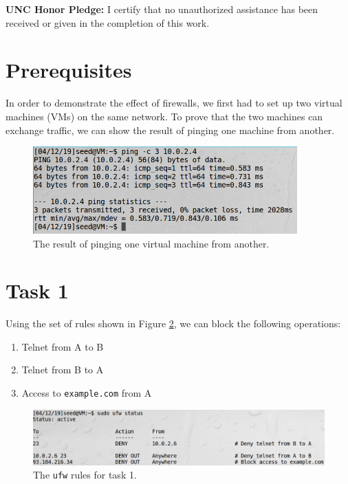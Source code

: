\documentclass[12pt,letterpaper]{article}
\author{Chathan Driehuys}
\begin{document}
	\noindent \textbf{UNC Honor Pledge:} I certify that no unauthorized assistance has been received or given in the completion of this work.
	
	\vspace{.5in}
	
	\section*{Prerequisites}
		In order to demonstrate the effect of firewalls, we first had to set up two virtual machines (VMs) on the same network. To prove that the two machines can exchange traffic, we can show the result of pinging one machine from another.
		
		\begin{figure}[h]
			\begin{center}
				\includegraphics[width=4in]{task-0-ping}
			\end{center}
			\caption{The result of pinging one virtual machine from another.}
			\label{fig:task-0-ping}
		\end{figure}
	
	\section*{Task 1}
		Using the set of rules shown in Figure \ref{fig:task-1-ufw-rules}, we can block the following operations:
		
		\begin{enumerate}
			\item Telnet from A to B
			\item Telnet from B to A
			\item Access to \texttt{example.com} from A
		\end{enumerate}
		
		\begin{figure}
			\begin{center}
				\includegraphics[width=\linewidth]{task-1-ufw-rules}
			\end{center}
			\caption{The \texttt{ufw} rules for task 1.}
			\label{fig:task-1-ufw-rules}
		\end{figure}
	
\end{document}
